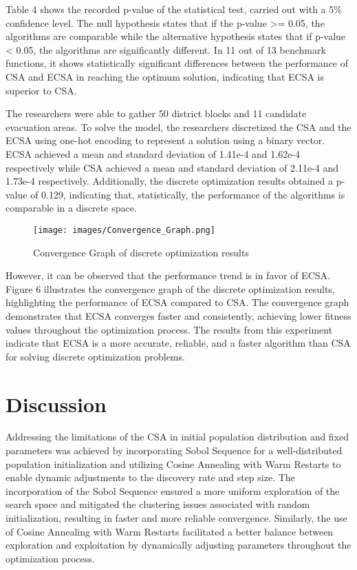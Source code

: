 \documentclass{article}
\begin{document}
Table 4 shows the recorded p-value of the statistical test, carried out with a 5\% confidence level. The null hypothesis states that if the p-value >= 0.05, the algorithms are comparable while the alternative hypothesis states that if p-value < 0.05, the algorithms are significantly different. In 11 out of 13 benchmark functions, it shows statistically significant differences between the performance of CSA and ECSA in reaching the optimum solution, indicating that ECSA is superior to CSA.

The researchers were able to gather 50 district blocks and 11 candidate evacuation areas. To solve the model, the researchers discretized the CSA and the ECSA using one-hot encoding to represent a solution using a binary vector. ECSA achieved a mean and standard deviation of 1.41e-4 and 1.62e-4 respectively while CSA achieved a mean and standard deviation of 2.11e-4 and 1.73e-4 respectively. Additionally, the discrete optimization results obtained a p-value of 0.129, indicating that, statistically, the performance of the algorithms is comparable in a discrete space.

\begin{figure}[htbp]
    \centering
    \texttt{[image: images/Convergence\_Graph.png]}
    \caption{Convergence Graph of discrete optimization results}
    \label{fig:dsa convergence graph}
\end{figure}

However, it can be observed that the performance trend is in favor of ECSA. Figure 6 illustrates the convergence graph of the discrete optimization results, highlighting the performance of ECSA compared to CSA. The convergence graph demonstrates that ECSA converges faster and consistently, achieving lower fitness values throughout the optimization process. The results from this experiment indicate that ECSA is a more accurate, reliable, and a faster algorithm than CSA for solving discrete optimization problems.

\section{Discussion}

Addressing the limitations of the CSA in initial population distribution and fixed parameters was achieved by incorporating Sobol Sequence for a well-distributed population initialization and utilizing Cosine Annealing with Warm Restarts to enable dynamic adjustments to the discovery rate and step size. The incorporation of the Sobol Sequence ensured a more uniform exploration of the search space and mitigated the clustering issues associated with random initialization, resulting in faster and more reliable convergence. Similarly, the use of Cosine Annealing with Warm Restarts facilitated a better balance between exploration and exploitation by dynamically adjusting parameters throughout the optimization process.
\end{document}
